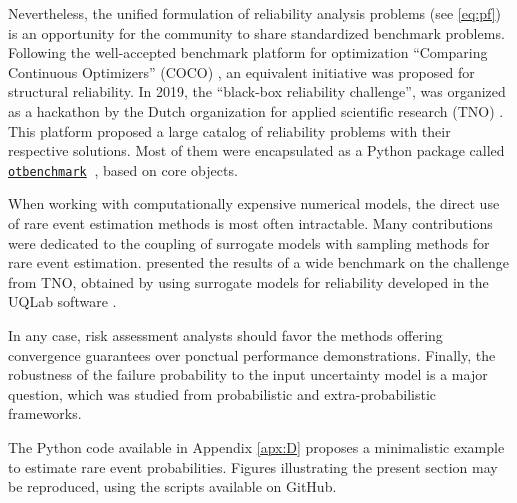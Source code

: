 Nevertheless, the unified formulation of reliability analysis problems (see \ref{eq:pf}) is an opportunity for the community to share standardized benchmark problems. 
Following the well-accepted benchmark platform for optimization ``Comparing Continuous Optimizers'' (COCO) \citep{hansen_2021_coco}, an equivalent initiative was proposed for structural reliability. 
In 2019, the ``black-box reliability challenge'', was organized as a hackathon by the Dutch organization for applied scientific research (TNO) \citep{rozsas_2019_bbrc}. 
This platform proposed a large catalog of reliability problems with their respective solutions. 
Most of them were encapsulated as a Python package called \href{https://github.com/mbaudin47/otbenchmark/}{\texttt{otbenchmark}}\footnotemark$~$ \citep{fekhari_baudin_2021}, based on core \ot objects.  



When working with computationally expensive numerical models, the direct use of rare event estimation methods is most often intractable. 
Many contributions were dedicated to the coupling of surrogate models with sampling methods for rare event estimation. 
\citet{moustapha_ss_2022} presented the results of a wide benchmark on the challenge from TNO, obtained by using surrogate models for reliability developed in the UQLab software \citep{marelli_2014_uqlab}.  

In any case, risk assessment analysts should favor the methods offering convergence guarantees over ponctual performance demonstrations. 
Finally, the robustness of the failure probability to the input uncertainty model is a major question, which was studied from probabilistic \citep{lemaitre_2015_PLI} and extra-probabilistic \citep{ajenjo_2022_structural_safety} frameworks. 


\begin{otexample}
    The Python code available in Appendix \ref{apx:D} proposes a minimalistic \ot example to estimate rare event probabilities. 
    Figures illustrating the present section may be reproduced, using the \ot scripts available on GitHub\footnotemark.  
\end{otexample}



